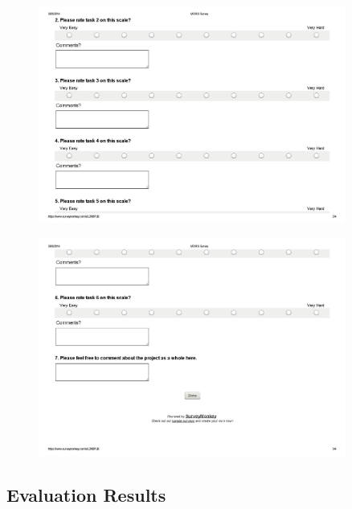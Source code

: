 \documentclass{l3proj}
\begin{document}
\newpage
\begin{figure}[ht!]
\centering
\includegraphics[angle=270, width=0.9\textwidth]{images/mdrs_survey-page-002.jpg}
\end{figure}

\newpage
\begin{figure}[ht!]
\centering
\includegraphics[angle=270, width=0.9\textwidth]{images/mdrs_survey-page-003.jpg}
\end{figure}

\newpage
\subsection{Evaluation Results}
\end{document}

